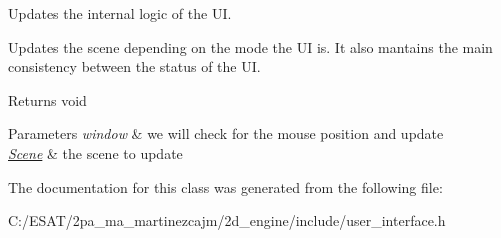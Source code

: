 Updates the internal logic of the UI. 

Updates the scene depending on the mode the UI is. It also mantains the main consistency between the status of the UI.

\begin{DoxyReturn}{Returns}
void 
\end{DoxyReturn}

\begin{DoxyParams}{Parameters}
{\em window} & we will check for the mouse position and update \\
\hline
{\em \hyperlink{class_scene}{Scene}} & the scene to update \\
\hline
\end{DoxyParams}


The documentation for this class was generated from the following file\+:\begin{DoxyCompactItemize}
\item 
C\+:/\+E\+S\+A\+T/2pa\+\_\+ma\+\_\+martinezcajm/2d\+\_\+engine/include/user\+\_\+interface.\+h\end{DoxyCompactItemize}
